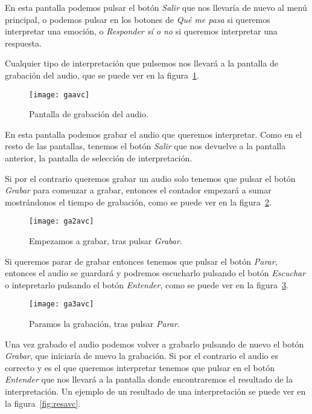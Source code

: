 En esta pantalla podemos pulsar el botón \textit{Salir} que nos llevaría de nuevo al menú principal, o podemos pulsar en los botones de \textit{Qué me pasa} si queremos interpretar una emoción, o \textit{Responder sí o no} si queremos interpretar una respuesta.

Cualquier tipo de interpretación que pulsemos nos llevará a la pantalla de grabación del audio, que se puede ver en la figura~\ref{fig:gaavc}.

\begin{figure}[htp]
	\centering
	\texttt{[image: gaavc]}
	\caption{Pantalla de grabación del audio.}
	\label{fig:gaavc}
\end{figure}

En esta pantalla podemos grabar el audio que queremos interpretar. Como en el resto de las pantallas, tenemos el botón \textit{Salir} que nos devuelve a la pantalla anterior, la pantalla de selección de interpretación.

Si por el contrario queremos grabar un audio solo tenemos que pulsar el botón \textit{Grabar} para comenzar a grabar, entonces el contador empezará a sumar mostrándonos el tiempo de grabación, como se puede ver en la figura~\ref{fig:ga2avc}.

\begin{figure}[htp]
	\centering
	\texttt{[image: ga2avc]}
	\caption{Empezamos a grabar, tras pulsar \textit{Grabar}.}
	\label{fig:ga2avc}
\end{figure}

Si queremos parar de grabar entonces tenemos que pulsar el botón \textit{Parar}, entonces el audio se guardará y podremos escucharlo pulsando el botón \textit{Escuchar} o intepretarlo pulsando el botón \textit{Entender}, como se puede ver en la figura~\ref{fig:ga3avc}.

\begin{figure}[htp]
	\centering
	\texttt{[image: ga3avc]}
	\caption{Paramos la grabación, tras pulsar \textit{Parar}.}
	\label{fig:ga3avc}
\end{figure}

Una vez grabado el audio podemos volver a grabarlo pulsando de nuevo el botón \textit{Grabar}, que iniciaría de nuevo la grabación. Si por el contrario el audio es correcto y es el que queremos interpretar tenemos que pulsar en el botón \textit{Entender} que nos llevará a la pantalla donde encontraremos el resultado de la interpretación. Un ejemplo de un resultado de una interpretación se puede ver en la figura~\ref{fig:resavc}.

